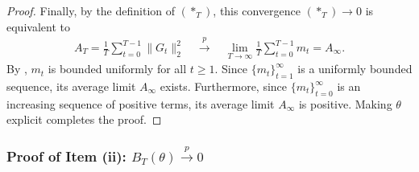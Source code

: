 \documentclass[a4paper, 11pt]{article}
\theoremstyle{definition}
\begin{document}
\begin{proof}
	Finally, by the definition of $(*_T)$, this convergence $(*_T) \to 0$ is equivalent to
	\begin{align}
		A_T = \frac{1}{T} \sum_{t = 0}^{T-1} \| G_{t} \|_2^2 \quad \overset{p}{\longrightarrow} \quad \lim_{T \to \infty} \frac{1}{T} \sum_{t = 0}^{T-1} m_{t} = A_\infty .
	\end{align}
	By , $m_t$ is bounded uniformly for all $t \ge 1$.
	Since $\{ m_t \}_{t=1}^{\infty}$ is a uniformly bounded sequence, its average limit $A_\infty$ exists.
	Furthermore, since $\{ m_t \}_{t=0}^{\infty}$ is an increasing sequence of positive terms, its average limit $A_\infty$ is positive.
    Making $\theta$ explicit completes the proof.
\end{proof}



\subsubsection{Proof of Item (ii): $B_T(\theta) \overset{p}{\longrightarrow} 0$} \label{apx:proof_B_T_convergence}
\end{document}
